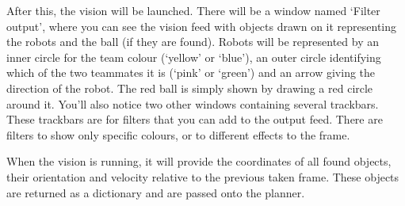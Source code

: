 After this, the vision will be launched. There will be a window named ‘Filter output’, where you can see the vision feed with objects drawn on it representing the robots and the ball (if they are found). Robots will be represented by an inner circle for the team colour (‘yellow’ or ‘blue’), an outer circle identifying which of the two teammates it is (‘pink’ or ‘green’) and an arrow giving the direction of the robot.  The red ball is simply shown by drawing a red circle around it. You’ll also notice two other windows containing several trackbars. These trackbars are for filters that you can add to the output feed. There are filters to show only specific colours, or to different effects to the frame.

When the vision is running, it will provide the coordinates of all found objects, their orientation and velocity relative to the previous taken frame. These objects are returned as a dictionary and are passed onto the planner.

